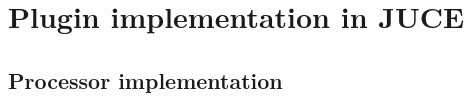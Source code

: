 \documentclass[a4paper,12pt]{report}
\begin{document}

\section{Plugin implementation in JUCE}
\subsection{Processor implementation}
\end{document}
